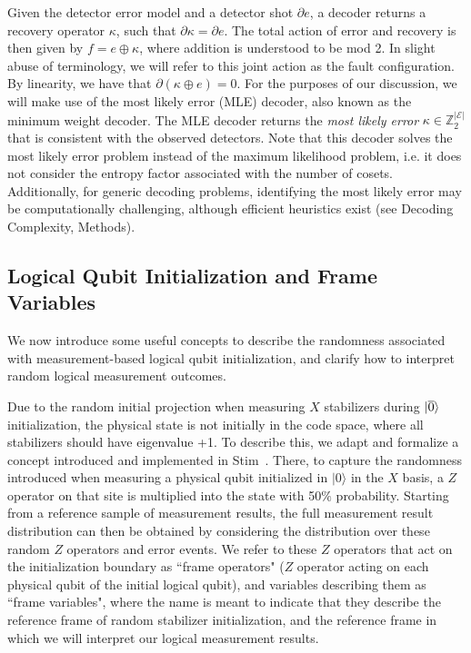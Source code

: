 Given the detector error model and a detector shot $\partial e$, a decoder returns a recovery operator $\kappa$, such that $\partial\kappa=\partial e$.
%
The total action of error and recovery is then given by $f=e\oplus\kappa$, where addition is understood to be mod 2.
%
In slight abuse of terminology, we will refer to this joint action as the fault configuration.
%
By linearity, we have that $\partial(\kappa\oplus e)=0$.
%
For the purposes of our discussion, we will make use of the most likely error (MLE) decoder, also known as the minimum weight decoder.
%
The MLE decoder returns the \textit{most likely error} $\kappa\in \mathbb{Z}_2^{|\mathcal{E}|}$ that is consistent with the observed detectors.
%
Note that this decoder solves the most likely error problem instead of the maximum likelihood problem, i.e. it does not consider the entropy factor associated with the number of cosets.
%
Additionally, for generic decoding problems, identifying the most likely error may be computationally challenging, although efficient heuristics exist (see Decoding Complexity, Methods).

\subsection{Logical Qubit Initialization and Frame Variables}
\label{si_sec:frame}

We now introduce some useful concepts to describe the randomness associated with measurement-based logical qubit initialization, and clarify how to interpret random logical measurement outcomes.

Due to the random initial projection when measuring $X$ stabilizers during $|{\overline{0}}\rangle$ initialization, the physical state is not initially in the code space, where all stabilizers should have eigenvalue +1.
%
To describe this, we adapt and formalize a concept introduced and implemented in Stim~\cite{gidney2021stim}.
%
There, to capture the randomness introduced when measuring a physical qubit initialized in $|0\rangle$ in the $X$ basis, a $Z$ operator on that site is multiplied into the state with 50$\%$ probability.
%
Starting from a reference sample of measurement results, the full measurement result distribution can then be obtained by considering the distribution over these random $Z$ operators and error events.
%
We refer to these $Z$ operators that act on the initialization boundary as ``frame operators" ($Z$ operator acting on each physical qubit of the initial logical qubit), and variables describing them as ``frame variables", where the name is meant to indicate that they describe the reference frame of random stabilizer initialization, and the reference frame in which we will interpret our logical measurement results.

